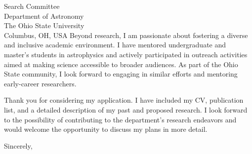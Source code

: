 \documentclass[11pt]{letter}
\begin{document}
\begin{letter}{Search Committee \\ Department of Astronomy \\ The Ohio State University \\ Columbus, OH, USA}
Beyond research, I am passionate about fostering a diverse and inclusive academic environment. I have mentored undergraduate and master’s students in astrophysics and actively participated in outreach activities aimed at making science accessible to broader audiences. As part of the Ohio State community, I look forward to engaging in similar efforts and mentoring early-career researchers.

Thank you for considering my application. I have included my CV, publication list, and a detailed description of my past and proposed research. I look forward to the possibility of contributing to the department’s research endeavors and would welcome the opportunity to discuss my plans in more detail.

\closing{Sincerely,}

\end{letter}
\end{document}
